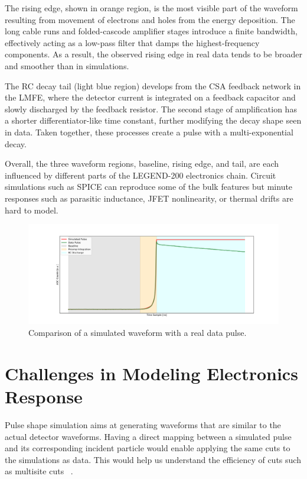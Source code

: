 The rising edge, shown in orange region, is the most visible part of the waveform resulting from movement of electrons and holes from the energy deposition. The long cable runs and folded-cascode amplifier stages introduce a finite bandwidth, effectively acting as a low-pass filter that damps the highest-frequency components. As a result, the observed rising edge in real data tends to be broader and smoother than in simulations. 

The RC decay tail (light blue region) develops from the CSA feedback network in the LMFE, where the detector current is integrated on a feedback capacitor and slowly discharged by the feedback resistor. The second stage of amplification has a shorter differentiator-like time constant, further modifying the decay shape seen in data. Taken together, these processes create a pulse with a multi-exponential decay. 


Overall, the three waveform regions, baseline, rising edge, and tail, are each influenced by different parts of the LEGEND-200 electronics chain. Circuit simulations such as SPICE can reproduce some of the bulk features but minute responses such as parasitic inductance, JFET nonlinearity, or thermal drifts are hard to model.

\begin{figure}[!htb]%
    \includegraphics[width=\linewidth,trim={4cm 0pc 3.5cm 0pc},clip]{ch6/figs/wf_comp_sim_data.png}
    \caption{Comparison of a simulated waveform with a real data pulse.}
    \label{fig:sim_data_comp}
\end{figure}

\section{Challenges in Modeling Electronics Response}

Pulse shape simulation aims at generating waveforms that are similar to the actual detector waveforms. Having a direct mapping between a simulated pulse and its corresponding incident particle would enable applying the same cuts to the simulations as data. This would help us understand the efficiency of cuts such as multisite cuts ~\cite{AvsE}.  


